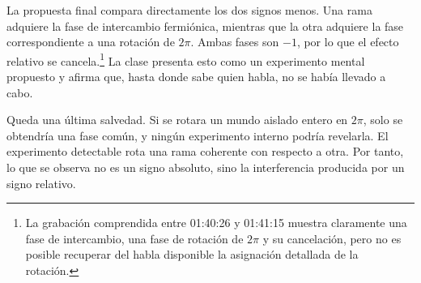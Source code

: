 La propuesta final compara directamente los dos signos menos. Una rama adquiere la fase de intercambio fermiónica, mientras que la otra adquiere la fase correspondiente a una rotación de \(2\pi\). Ambas fases son \(-1\), por lo que el efecto relativo se cancela.\footnote{La grabación comprendida entre 01:40:26 y 01:41:15 muestra claramente una fase de intercambio, una fase de rotación de \(2\pi\) y su cancelación, pero no es posible recuperar del habla disponible la asignación detallada de la rotación.} La clase presenta esto como un experimento mental propuesto y afirma que, hasta donde sabe quien habla, no se había llevado a cabo.

\begin{classroomqa}
\end{classroomqa}

Queda una última salvedad. Si se rotara un mundo aislado entero en \(2\pi\), solo se obtendría una fase común, y ningún experimento interno podría revelarla. El experimento detectable rota una rama coherente con respecto a otra. Por tanto, lo que se observa no es un signo absoluto, sino la interferencia producida por un signo relativo.
